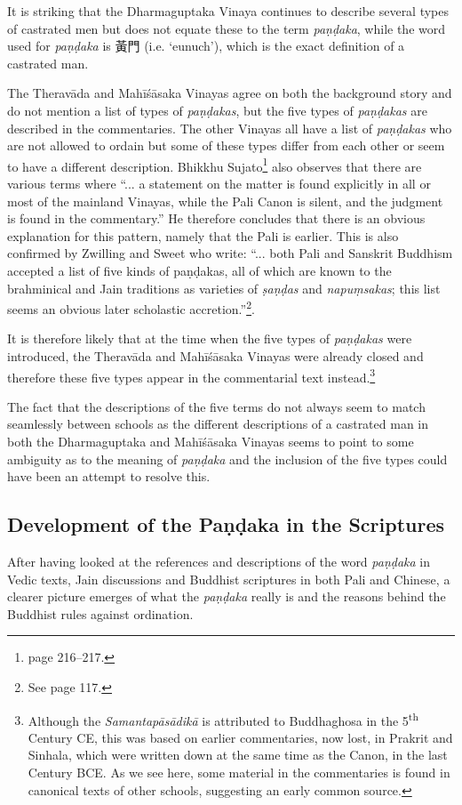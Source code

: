It is striking that the Dharmaguptaka Vinaya continues to describe several types of castrated men but does not equate these to the term {\em paṇḍaka}, while the word used for {\em paṇḍaka} is 黃門 (i.e. `eunuch'), which is the exact definition of a castrated man.

The Theravāda and Mahīśāsaka Vinayas agree on both the background story and do not mention a list of types of {\em paṇḍakas}, but the five types of {\em paṇḍakas} are described in the commentaries. The other Vinayas all have a list of {\em paṇḍakas} who are not allowed to ordain but some of these types differ from each other or seem to have a different description. Bhikkhu Sujato\footnote{\cite{sujato2009} page 216–217.} also observes that there are various terms where ``... a statement on the matter is found explicitly in all or most of the mainland Vinayas, while the Pali Canon is silent, and the judgment is found in the commentary.'' He therefore concludes that there is an obvious explanation for this pattern, namely that the Pali is earlier. This is also confirmed by Zwilling and Sweet who write: ``... both Pali and Sanskrit Buddhism accepted a list of five kinds of paṇḍakas, all of which are known to the brahminical and Jain traditions as varieties of {\em ṣaṇḍas} and {\em napuṃsakas}; this list seems an obvious later scholastic accretion.''\footnote{See \cite{zwilling200} page 117.}.

It is therefore likely that at the time when the five types of {\em paṇḍakas} were introduced, the Theravāda and Mahīśāsaka Vinayas were already closed and therefore these five types appear in the commentarial text instead.\footnote{Although the {\em Samantapāsādikā} is attributed to Buddhaghosa in the 5\textsuperscript{th} Century CE, this was based on earlier commentaries, now lost, in Prakrit and Sinhala, which were written down at the same time as the Canon, in the last Century BCE. As we see here, some material in the commentaries is found in canonical texts of other schools, suggesting an early common source.} 

The fact that the descriptions of the five terms do not always seem to match seamlessly between schools as the different descriptions of a castrated man in both the Dharmaguptaka and Mahīśāsaka Vinayas seems to point to some ambiguity as to the meaning of {\em paṇḍaka} and the inclusion of the five types could have been an attempt to resolve this.


\subsection{Development of the Paṇḍaka in the Scriptures}
After having looked at the references and descriptions of the word {\em paṇḍaka} in Vedic texts, Jain discussions and Buddhist scriptures in both Pali and Chinese, a clearer picture emerges of what the {\em paṇḍaka} really is and the reasons behind the Buddhist rules against ordination.

